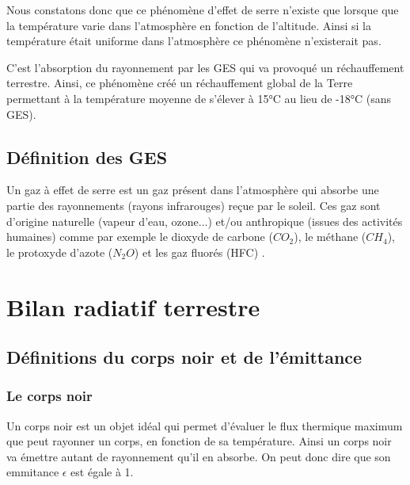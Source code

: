 \documentclass[a4paper, 12pt]{report} %
\begin{document}
Nous constatons donc que ce phénomène d'effet de serre n'existe 
que lorsque que la température varie dans l'atmosphère en 
fonction de l'altitude. Ainsi si la température était uniforme 
dans l'atmosphère ce phénomène n'existerait pas. \vspace{\baselineskip}

	C'est l'absorption du rayonnement par les GES qui va 
provoqué un réchauffement terrestre. Ainsi, ce phénomène 
créé un réchauffement global de la Terre permettant à la 
température moyenne de s'élever à 15°C au lieu de -18°C 
(sans GES). 

\subsection{Définition des GES}
Un gaz à effet de serre est un gaz présent dans l'atmosphère qui 
absorbe une partie des rayonnements (rayons infrarouges) 
reçue par le soleil. Ces gaz sont d'origine naturelle 
(vapeur d'eau, ozone...) et/ou anthropique 
(issues des activités humaines) comme par exemple le dioxyde 
de carbone ($CO_2$), le méthane ($CH_4$), le protoxyde d'azote
($N_2O$) et les gaz fluorés (HFC) . \vspace{\baselineskip}


\section{Bilan radiatif terrestre}
\subsection{Définitions du corps noir et de l'émittance}

\subsubsection{Le corps noir}
Un corps noir est un objet idéal qui permet d'évaluer le flux thermique maximum
que peut rayonner un corps, en fonction de sa température. Ainsi un corps noir 
va émettre autant de rayonnement qu'il en absorbe. On peut donc dire que son 
emmitance $ \epsilon$  est égale à 1. 
\end{document}
